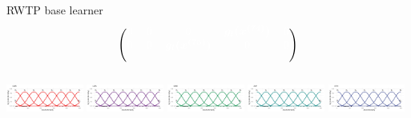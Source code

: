\documentclass[t,10pt]{beamer}
\begin{document}
\begin{frame}{RWTP base learner}
$$\begin{blockarray}{ccccc}
\begin{block}{(ccccc)}
      \color{white}0 & \color{white}0 & \color{white}0 & \color{white}\bm{g_l(x^{(74)})} & \color{white}0 \\
      \color{white}0 & \color{white}0 & \color{white}\bm{g_l(x^{(75)})} & \color{white}0 & \color{white}0 \\
      \phantom{x}\\
    \end{block}
  \end{blockarray}
  $$
  \normalsize
  {\includegraphics[width=0.19\textwidth]{figures/fig-bs0-GER.png}}
  {\includegraphics[width=0.19\textwidth]{figures/fig-bs0-USA.png}}
  {\includegraphics[width=0.19\textwidth]{figures/fig-bs0-SWE.png}}
  {\includegraphics[width=0.19\textwidth]{figures/fig-bs0-ZAF.png}}
  {\includegraphics[width=0.19\textwidth]{figures/fig-bs0-ETH.png}}
  \addtocounter{framenumber}{-1}
\end{frame}
\end{document}
